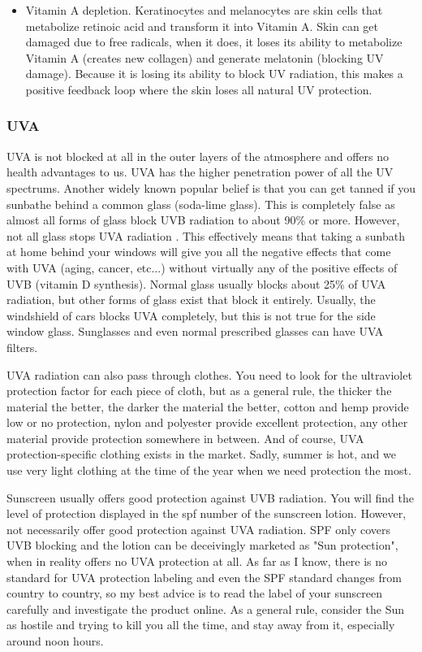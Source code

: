 \begin{itemize}
\item
Vitamin A depletion. Keratinocytes and melanocytes are skin cells that metabolize retinoic acid and transform it into  Vitamin A. Skin can get damaged due to free radicals, when it does, it loses its ability to metabolize Vitamin A (creates new collagen) and generate melatonin (blocking UV damage). Because it is losing its ability to block UV radiation, this makes a positive feedback loop where the skin loses all natural UV protection. 

\end{itemize}

\subsubsection{UVA}

UVA is not blocked at all in the outer layers of the atmosphere and offers no health advantages to us. UVA has the higher penetration power of all the UV spectrums. Another widely known popular belief is that you can get tanned if you sunbathe behind a common glass (soda-lime glass). This is completely false as almost all forms of glass block UVB radiation to about 90\% or more. However, not all glass stops UVA radiation \cite{ref:Duarte2009}. This effectively means that taking a sunbath at home behind your windows will give you all the negative effects that come with UVA (aging, cancer, etc...) without virtually any of the positive effects of UVB (vitamin D synthesis). Normal glass usually blocks about 25\% of UVA radiation, but other forms of glass exist that block it entirely. Usually, the windshield of cars blocks UVA completely, but this is not true for the side window glass. Sunglasses and even normal prescribed glasses can have UVA filters.

UVA radiation can also pass through clothes. You need to look for the ultraviolet protection factor for each piece of cloth, but as a general rule, the thicker the material the better, the darker the material the better, cotton and hemp provide low or no protection, nylon and polyester provide excellent protection, any other material provide protection somewhere in between. And of course, UVA protection-specific clothing exists in the market. Sadly, summer is hot, and we use very light clothing at the time of the year when we need protection the most.

Sunscreen usually offers good protection against UVB radiation. You will find the level of protection displayed in the \gls{spf} number of the sunscreen lotion. However, not necessarily offer good protection against UVA radiation. SPF only covers UVB blocking and the lotion can be deceivingly marketed as "Sun protection", when in reality offers no UVA protection at all. As far as I know, there is no standard for UVA protection labeling and even the SPF standard changes from country to country, so my best advice is to read the label of your sunscreen carefully and investigate the product online. As a general rule, consider the Sun as hostile and trying to kill you all the time, and stay away from it, especially around noon hours.

